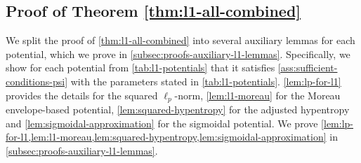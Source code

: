 \documentclass[a4paper]{article}
\theoremstyle{thmstyle}
\theoremstyle{defstyle}
\theoremstyle{remark}
\begin{document}
\subsection{Proof of Theorem \ref{thm:l1-all-combined}} 
\label{subsec:proof-l1-all-combined}


    We split the proof of \cref{thm:l1-all-combined} into several auxiliary lemmas for each potential, which we prove in \cref{subsec:proofs-auxiliary-l1-lemmas}.
    Specifically, we show for each potential from \cref{tab:l1-potentials} that it satisfies \cref{ass:sufficient-conditions-psi} with the parameters stated in \cref{tab:l1-potentials}. \cref{lem:lp-for-l1} provides the details for the squared $\ell_p$-norm, \cref{lem:l1-moreau} for the Moreau envelope-based potential, \cref{lem:squared-hypentropy} for the adjusted hypentropy and \cref{lem:sigmoidal-approximation} for the sigmoidal potential. We prove \cref{lem:lp-for-l1,lem:l1-moreau,lem:squared-hypentropy,lem:sigmoidal-approximation} in \cref{subsec:proofs-auxiliary-l1-lemmas}.
\end{document}
